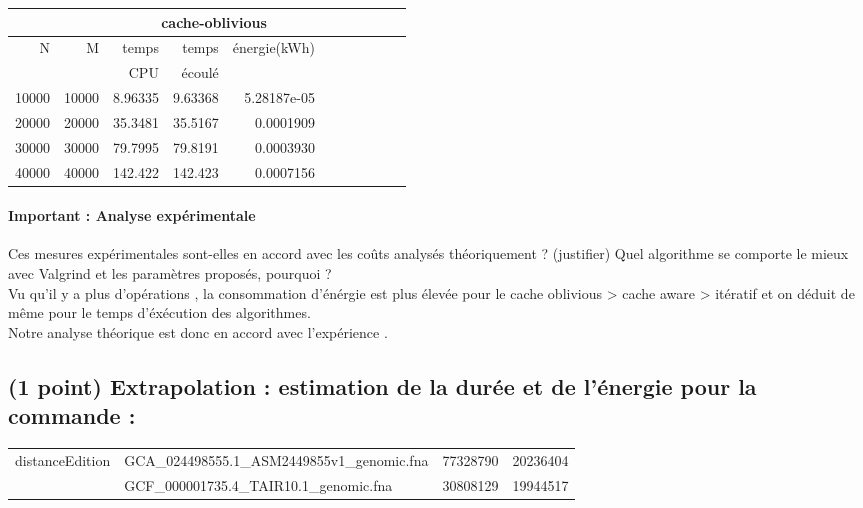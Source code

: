 \documentclass[10pt,a4paper]{article}
\begin{document}
\begin{tabular}{|r|r||r|r|r||r|r|r||r|r|r||}
  \hline
   \multicolumn{2}{|c||}{ } 
   & \multicolumn{3}{c||}{cache-oblivious}
   \\ \hline
N & M 

& temps   & temps & énergie(kWh)       %
\\
& 

& CPU     & écoulé&               %
\\ \hline
\hline
10000 & 10000 

& 8.96335 & 9.63368  & 5.28187e-05  %
\\ \hline
20000 & 20000 

& 35.3481 & 35.5167 & 0.0001909  %
\\ \hline
30000 & 30000 

& 79.7995 & 79.8191 & 0.0003930  %
\\ \hline
40000 & 40000 

& 142.422 & 142.423 & 0.0007156  %
\\ \hline
\hline
\end{tabular}

\paragraph{Important : Analyse expérimentale}
Ces mesures expérimentales sont-elles en accord avec les coûts analysés théoriquement ? (justifier)
Quel algorithme se comporte le mieux avec Valgrind et les paramètres proposés, pourquoi ?\\
Vu qu'il y a plus d'opérations , la consommation d'énérgie est plus élevée pour le cache oblivious > cache aware > itératif et on déduit de même pour le temps 
d'éxécution des algorithmes. \\ 
Notre analyse théorique est donc en accord avec l'expérience .\\ 

\subsection{(1 point) Extrapolation : estimation de la durée et de l'énergie pour la commande :}
\begin{tabular}{llll}
    distanceEdition & GCA\_024498555.1\_ASM2449855v1\_genomic.fna & 77328790 & 20236404 \\
    & GCF\_000001735.4\_TAIR10.1\_genomic.fna & 30808129 & 19944517
\end{tabular}
\end{document}
